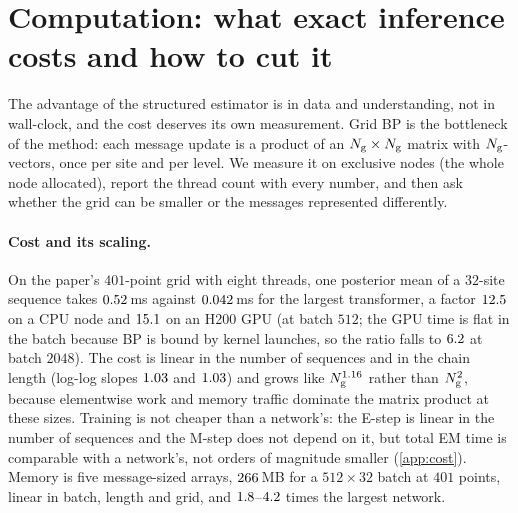 \section{Computation: what exact inference costs and how to cut it}
\label{sec:compute}

The advantage of the structured estimator is in data and understanding, not in wall-clock, and the cost
deserves its own measurement. Grid BP is the bottleneck of the method: each message update is a product of an
$N_{\mathrm{g}}\times N_{\mathrm{g}}$ matrix with $N_{\mathrm{g}}$-vectors, once per site and per level. We measure it on exclusive
nodes (the whole node allocated), report the thread count with every number, and then ask whether the grid
can be smaller or the messages represented differently.

\paragraph{Cost and its scaling.}
On the paper's $401$-point grid with eight threads, one posterior mean of a $32$-site sequence takes
$0.52$\,ms against $0.042$\,ms for the largest transformer, a factor
$12.5$ on a CPU node and $15.1$ on an H200 GPU (at batch $512$; the GPU time is flat in
the batch because BP is bound by kernel launches, so the ratio falls to $6.2$ at batch $2048$).
The cost is linear in the number of sequences and in the chain length (log-log slopes $1.03$ and
$1.03$) and grows like $N_{\mathrm{g}}^{1.16}$ rather than $N_{\mathrm{g}}^2$, because elementwise work and
memory traffic dominate the matrix product at these sizes. Training is not cheaper than a network's: the
E-step is linear in the number of sequences and the M-step does not depend on it, but total EM time is
comparable with a network's, not orders of magnitude smaller (\cref{app:cost}). Memory is five message-sized
arrays, $266$\,MB for a $512\times32$ batch at $401$ points, linear in batch, length and grid, and
$1.8$--$4.2$ times the largest network.

